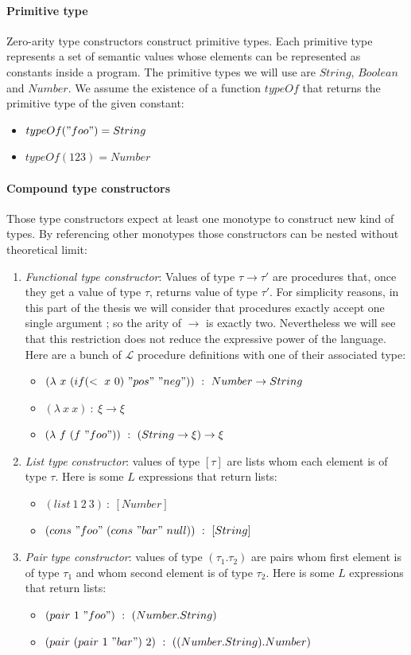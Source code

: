 \documentclass[a4paper]{report}
\newcommand{\lang}[0]{\mathcal{L}}
\begin{document}
\paragraph{Primitive type} Zero-arity type constructors construct primitive types. Each primitive type represents a set of semantic values whose elements can be represented as constants inside a program. The primitive types we will use are $String$, $Boolean$ and $Number$. We assume the existence of a function $typeOf$ that returns the primitive type of the given constant:
\begin{itemize}
\item $typeOf("foo")=String$
\item $typeOf(123)=Number$
\end{itemize}

\paragraph{Compound type constructors} Those type constructors expect at least one monotype to construct new kind of types. By referencing other monotypes those constructors can be nested without theoretical limit:
\begin{enumerate}
\item \emph{Functional type constructor}: Values of type $\tau\to\tau'$ are procedures that, once they get a value of type $\tau$, returns value of type $\tau'$. For simplicity reasons, in this part of the thesis we will consider that procedures exactly accept one single argument ; so the arity of $\to$ is exactly two. Nevertheless we will see that this restriction does not reduce the expressive power of the language. Here are a bunch of $\lang$ procedure definitions with one of their associated type:
\begin{itemize}
\item $(\lambda\ x\ (if (<\ x\ 0)\ "pos"\ "neg"))\ :\ Number\to String$
\item $(\lambda\ x\ x)\ :\ \xi\to\xi$
\item $(\lambda\ f\ (f\ "foo"))\ :\ (String\to\xi)\to\xi$
\end{itemize}
\item \emph{List type constructor}: values of type $[\tau]$ are lists whom each element is of type $\tau$. Here is some $L$ expressions that return lists:
\begin{itemize}
\item $(list\ 1\ 2\ 3)\ :\ [Number]$
\item $(cons\ "foo"\ (cons\ "bar"\ null))\ :\ [String]$
\end{itemize}
\item \emph{Pair type constructor}: values of type $(\tau_1.\tau_2)$ are pairs whom first element is of type $\tau_1$ and whom second element is of type $\tau_2$. Here is some $L$ expressions that return lists:
\begin{itemize}
\item $(pair\ 1\ "foo")\ :\ (Number.String)$
\item $(pair\ (pair\ 1\ "bar")\ 2)\ :\ ((Number.String).Number)$
\end{itemize}
\end{enumerate}
\end{document}
